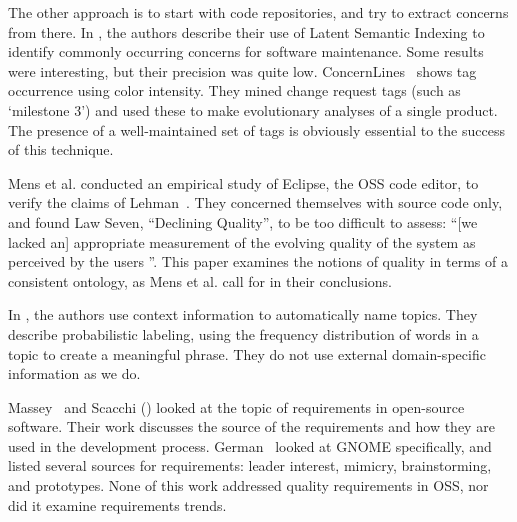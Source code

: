 \documentclass{acm_proc_article-sp}
\begin{document}
The other approach is to start with code repositories, and try to extract concerns from there. In \cite{marcus04wcre}, the authors describe their use of Latent Semantic Indexing to identify commonly occurring concerns for software maintenance. Some results were interesting, but their precision was quite low. ConcernLines~\cite{treude09cl} shows tag occurrence using color intensity. They mined change request tags (such as `milestone 3') and used these to make evolutionary analyses of a single product. The presence of a well-maintained set of tags is obviously essential to the success of this technique.


Mens et al. \cite{mens08icsm} conducted an empirical study of Eclipse, the OSS code editor, to verify the claims of Lehman~\cite{lehman97sms}. They concerned themselves with source code only, and found Law Seven, ``Declining Quality'', to be too difficult to assess: ``[we lacked an] appropriate measurement of the evolving quality of the system as perceived by the users \cite[p. 388]{mens08icsm}''. This paper examines the notions of quality in terms of a consistent ontology, as Mens et al. call for in their conclusions.

In \cite{Mei2007}, the authors use context information to automatically name topics. They describe probabilistic labeling, using the frequency distribution of words in a topic to create a meaningful phrase. They do not use external domain-specific information as we do.

Massey~\cite{massey02icse} and Scacchi (\cite{scacchi02,scacchi05b}) looked at the topic of requirements in open-source software. Their work discusses the source of the requirements and how they are used in the development process. German~\cite{german03gnome} looked at GNOME specifically, and listed several sources for requirements: leader interest, mimicry, brainstorming, and prototypes. None of this work  addressed quality requirements in OSS, nor did it examine requirements trends.
\end{document}
